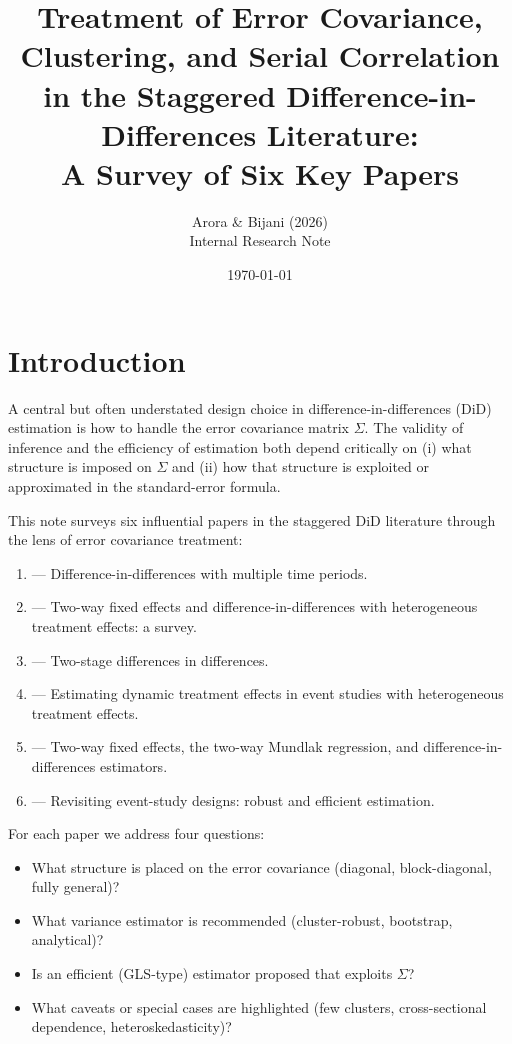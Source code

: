 \documentclass[12pt]{article}
\title{Treatment of Error Covariance, Clustering, and Serial Correlation\\
       in the Staggered Difference-in-Differences Literature:\\
       A Survey of Six Key Papers}
\author{Arora \& Bijani (2026)\\
        \small{Internal Research Note}}
\date{\today}
\begin{document}
\maketitle
\tableofcontents
\newpage

\section{Introduction}

A central but often understated design choice in difference-in-differences (DiD)
estimation is how to handle the error covariance matrix $\Sigma$.
The validity of inference and the efficiency of estimation both depend critically
on (i) what structure is imposed on $\Sigma$ and (ii) how that structure is
exploited or approximated in the standard-error formula.

This note surveys six influential papers in the staggered DiD literature through
the lens of error covariance treatment:

\begin{enumerate}
  \item \citet{callaway2021difference} --- Difference-in-differences with multiple
        time periods.
  \item \citet{dechaisemartin2023twoway} --- Two-way fixed effects and
        difference-in-differences with heterogeneous treatment effects: a survey.
  \item \citet{gardner2024twostage} --- Two-stage differences in differences.
  \item \citet{sun2021estimating} --- Estimating dynamic treatment effects in event
        studies with heterogeneous treatment effects.
  \item \citet{wooldridge2025twoway} --- Two-way fixed effects, the two-way Mundlak
        regression, and difference-in-differences estimators.
  \item \citet{borusyak2024revisiting} --- Revisiting event-study designs: robust
        and efficient estimation.
\end{enumerate}

For each paper we address four questions:
\begin{itemize}
  \item What structure is placed on the error covariance (diagonal, block-diagonal,
        fully general)?
  \item What variance estimator is recommended (cluster-robust, bootstrap,
        analytical)?
  \item Is an efficient (GLS-type) estimator proposed that exploits $\Sigma$?
  \item What caveats or special cases are highlighted (few clusters,
        cross-sectional dependence, heteroskedasticity)?
\end{itemize}
\end{document}
